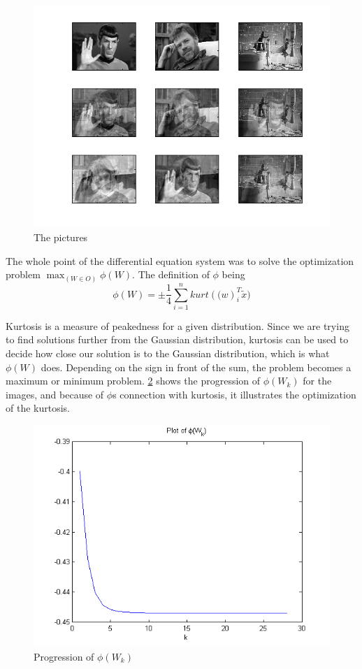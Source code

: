 \begin{figure}[!htbp]
\includegraphics[scale=1]{pappa.png}
\caption{The pictures}
\label{pappa}
\end{figure}


The whole point of the differential equation system was to solve the optimization problem $\max_{(W \in O)} \phi(W)$. The definition of $\phi$ being
\begin{equation}
\phi(W)=\pm \frac{1}{4}\sum^{n}_{i=1}kurt(\mathbf(w)_{i}^{T}\tilde{x})
\end{equation}

Kurtosis is a measure of peakedness for a given distribution. Since we are trying to find solutions further from the Gaussian distribution, kurtosis can be used to decide how close our solution is to the Gaussian distribution, which is what $\phi(W)$ does. Depending on the sign in front of the sum, the problem becomes a maximum or minimum problem. \cref{phiW} shows the progression of $\phi(W_k)$ for the images, and because of $\phi$s connection with kurtosis, it illustrates the optimization of the kurtosis.


\begin{figure}
\includegraphics[scale=0.8]{phiW.png}
\caption{Progression of $\phi(W_k)$ }
\label{phiW}
\end{figure}


